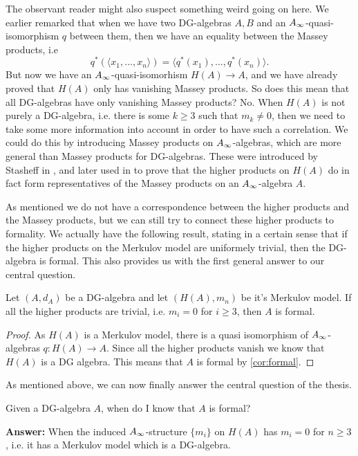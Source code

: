 \begin{remark}
The observant reader might also suspect something weird going on here. We earlier remarked that when we have two DG-algebras $A, B$ and an $A_{\infty}$-quasi-isomorphism $q$ between them, then we have an equality between the Massey products, i.e 
\begin{equation*}
	q^*(\langle x_1, \ldots, x_n\rangle ) = \langle q^*(x_1),\ldots, q^*(x_n)\rangle .
\end{equation*}
But now we have an $A_{\infty}$-quasi-isomorhism $H(A)\longrightarrow A$, and we have already proved that $H(A)$ only has vanishing Massey products. So does this mean that all DG-algebras have only vanishing Massey products? No. When $H(A)$ is not purely a DG-algebra, i.e. there is some $k\geq 3$ such that $m_k\neq 0$, then we need to take some more information into account in order to have such a correlation. We could do this by introducing Massey products on $A_{\infty}$-algebras, which are more general than Massey products for DG-algebras. These were introduced by Stasheff in \cite{h-spaces}, and later used in \cite{infty-massey} to prove that the higher products on $H(A)$ do in fact form representatives of the Massey products on an $A_{\infty}$-algebra $A$.
\end{remark}

As mentioned we do not have a correspondence between the higher products and the Massey products, but we can still try to connect these higher products to formality. We actually have the following result, stating in a certain sense that if the higher products on the Merkulov model are uniformely trivial, then the DG-algebra is formal. This also provides us with the first general answer to our central question.

\begin{theorem}
Let $(A, d_A)$ be a DG-algebra and let $(H(A), m_n)$ be it's Merkulov model. If all the higher products are trivial, i.e. $m_i = 0$ for $i\geq 3$, then $A$ is formal. 
\end{theorem}
\label{thm:formal_iff_no_infty_massey}
\begin{proof}
As $H(A)$ is a Merkulov model, there is a quasi isomorphism of $A_{\infty}$-algebras $q:H(A)\longrightarrow A$. Since all the higher products vanish we know that $H(A)$ is a DG algebra. This means that $A$ is formal by \cref{cor:formal}. 
\end{proof}

As mentioned above, we can now finally answer the central question of the thesis. 
\begin{central}
Given a DG-algebra $A$, when do I know that $A$ is formal?
\end{central}
\textbf{Answer:} When the induced $A_{\infty}$-structure $\{m_i\}$ on $H(A)$ has $m_i=0$ for $n\geq 3$, i.e. it has a Merkulov model which is a DG-algebra.  

